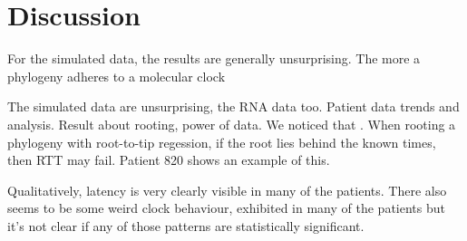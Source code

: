 \section{Discussion} \label{sec:discuss}
For the simulated data, the results are generally unsurprising. The more a phylogeny adheres to a molecular clock 

The simulated data are unsurprising, the RNA data too. Patient data trends and analysis. Result about rooting, power of data.
We noticed that . When rooting a phylogeny with root-to-tip regession, if the root lies behind the known times, then RTT may fail. Patient 820 shows an example of this.

Qualitatively, latency is very clearly visible in many of the patients. There also seems to be some weird clock behaviour, exhibited in many of the patients but it’s not clear if any of those patterns are statistically significant. 

